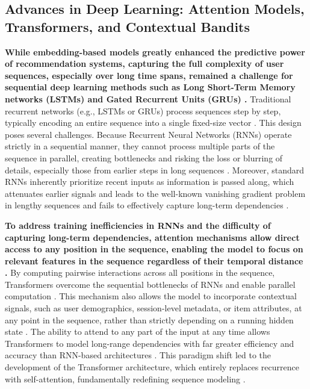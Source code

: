 \documentclass[final]{anthology-ch}         %
\begin{document}
\subsection{Advances in Deep Learning: Attention Models, Transformers, and Contextual Bandits}

\textbf{While embedding-based models greatly enhanced the predictive power of recommendation systems, capturing the full complexity of user sequences, especially over long time spans, remained a challenge for sequential deep learning methods such as  Long Short-Term Memory networks (LSTMs) and Gated Recurrent Units (GRUs) \cite{vaswani2017attention} \cite{gao2024mamba}.} Traditional recurrent networks (e.g., LSTMs or GRUs) process sequences step by step, typically encoding an entire sequence into a single fixed-size vector \cite{Sutskever2014}. This design poses several challenges. Because Recurrent Neural Networks (RNNs) operate strictly in a sequential manner, they cannot process multiple parts of the sequence in parallel, creating bottlenecks and risking the loss or blurring of details, especially those from earlier steps in long sequences \cite{vaswani2017attention}.  Moreover, standard RNNs inherently prioritize recent inputs as information is passed along, which attenuates earlier signals and leads to the well-known vanishing gradient problem in lengthy sequences and fails to effectively capture long-term dependencies \cite{Bengio1994}\cite{Pascanu2013}. 


\textbf{To address training inefficiencies in RNNs and the difficulty of capturing long-term dependencies, attention mechanisms allow direct access to any position in the sequence, enabling the model to focus on relevant features in the sequence regardless of their temporal distance \cite{vaswani2017attention}. }By computing pairwise interactions across all positions in the sequence, Transformers overcome the sequential bottlenecks of RNNs and enable parallel computation \cite{vaswani2017attention}.  This mechanism also allows the model to incorporate contextual signals, such as user demographics, session-level metadata, or item attributes, at any point in the sequence, rather than strictly depending on a running hidden state \cite{kang2018sasrec}. The ability to attend to any part of the input at any time allows Transformers to model long-range dependencies with far greater efficiency and accuracy than RNN-based architectures \cite{vaswani2017attention}. This paradigm shift led to the development of the Transformer architecture, which entirely replaces recurrence with self-attention, fundamentally redefining sequence modeling \cite{vaswani2017attention}.
\end{document}
